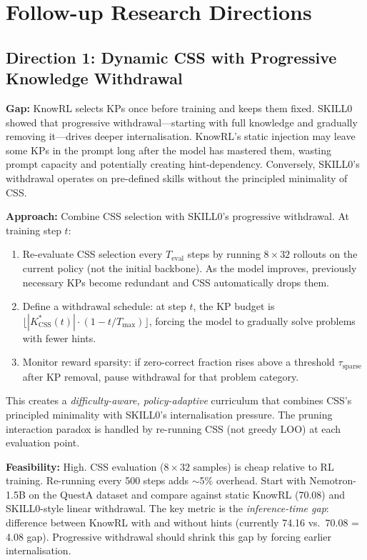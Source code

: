 \documentclass[11pt]{article}
\begin{document}
\section{Follow-up Research Directions}

\subsection{Direction 1: Dynamic CSS with Progressive Knowledge Withdrawal}

\textbf{Gap:} KnowRL selects KPs once before training and keeps them fixed. SKILL0~\cite{skill0} showed that progressive withdrawal---starting with full knowledge and gradually removing it---drives deeper internalisation. KnowRL's static injection may leave some KPs in the prompt long after the model has mastered them, wasting prompt capacity and potentially creating hint-dependency. Conversely, SKILL0's withdrawal operates on pre-defined skills without the principled minimality of CSS.

\textbf{Approach:} Combine CSS selection with SKILL0's progressive withdrawal. At training step $t$:
\begin{enumerate}
    \item Re-evaluate CSS selection every $T_{\mathrm{eval}}$ steps by running $8 \times 32$ rollouts on the current policy (not the initial backbone). As the model improves, previously necessary KPs become redundant and CSS automatically drops them.
    \item Define a withdrawal schedule: at step $t$, the KP budget is $\lfloor |K^{*}_{\mathrm{CSS}}(t)| \cdot (1 - t/T_{\mathrm{max}}) \rfloor$, forcing the model to gradually solve problems with fewer hints.
    \item Monitor reward sparsity: if zero-correct fraction rises above a threshold $\tau_{\mathrm{sparse}}$ after KP removal, pause withdrawal for that problem category.
\end{enumerate}

This creates a \textit{difficulty-aware, policy-adaptive} curriculum that combines CSS's principled minimality with SKILL0's internalisation pressure. The pruning interaction paradox is handled by re-running CSS (not greedy LOO) at each evaluation point.

\textbf{Feasibility:} High. CSS evaluation ($8 \times 32$ samples) is cheap relative to RL training. Re-running every 500 steps adds $\sim$5\% overhead. Start with Nemotron-1.5B on the QuestA dataset and compare against static KnowRL (70.08) and SKILL0-style linear withdrawal. The key metric is the \textit{inference-time gap}: difference between KnowRL with and without hints (currently 74.16 vs.\ 70.08 = 4.08 gap). Progressive withdrawal should shrink this gap by forcing earlier internalisation.
\end{document}
